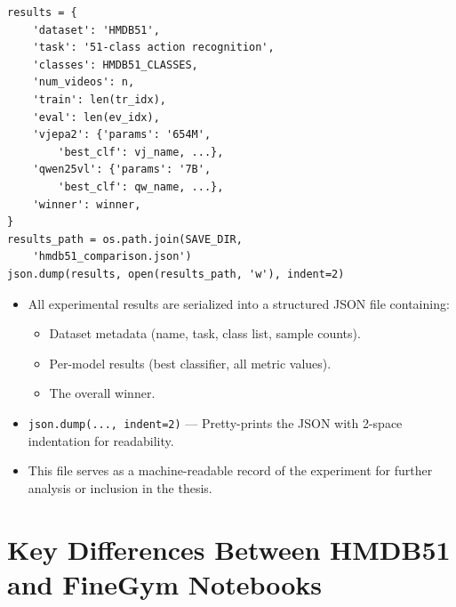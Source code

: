 \begin{lstlisting}
results = {
    'dataset': 'HMDB51',
    'task': '51-class action recognition',
    'classes': HMDB51_CLASSES,
    'num_videos': n,
    'train': len(tr_idx),
    'eval': len(ev_idx),
    'vjepa2': {'params': '654M',
        'best_clf': vj_name, ...},
    'qwen25vl': {'params': '7B',
        'best_clf': qw_name, ...},
    'winner': winner,
}
results_path = os.path.join(SAVE_DIR,
    'hmdb51_comparison.json')
json.dump(results, open(results_path, 'w'), indent=2)
\end{lstlisting}

\begin{explanation}
\begin{itemize}[nosep]
  \item All experimental results are serialized into a structured JSON file containing:
  \begin{itemize}[nosep]
    \item Dataset metadata (name, task, class list, sample counts).
    \item Per-model results (best classifier, all metric values).
    \item The overall winner.
  \end{itemize}
  \item \texttt{json.dump(..., indent=2)} --- Pretty-prints the JSON with 2-space indentation for readability.
  \item This file serves as a machine-readable record of the experiment for further analysis or inclusion in the thesis.
\end{itemize}
\end{explanation}

\newpage
\section{Key Differences Between HMDB51 and FineGym Notebooks}

